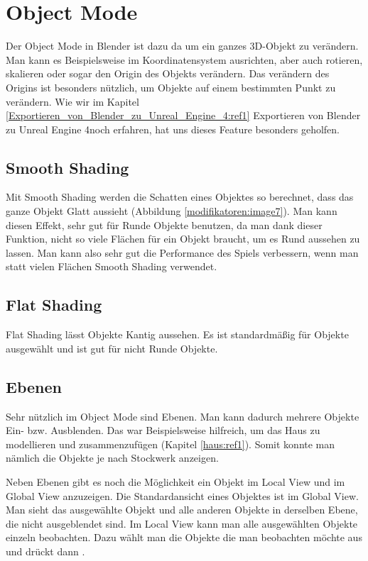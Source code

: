 \section{Object Mode}
Der Object Mode in Blender ist dazu da um ein ganzes 3D-Objekt zu verändern. Man kann es Beispielsweise im Koordinatensystem ausrichten, aber
auch rotieren, skalieren oder sogar den Origin des Objekts verändern. Das verändern des Origins ist besonders nützlich, um Objekte auf
einem bestimmten Punkt zu verändern. Wie wir im Kapitel \ref{Exportieren_von_Blender_zu_Unreal_Engine_4:ref1} \dq Exportieren von Blender zu Unreal Engine 4\dq noch erfahren, hat uns dieses Feature besonders geholfen.

\subsection{Smooth Shading}
\label{objectMode:smoothshading}
Mit Smooth Shading werden die Schatten eines Objektes so berechnet, dass das ganze Objekt Glatt aussieht (Abbildung \ref{modifikatoren:image7}).
Man kann diesen Effekt, sehr gut für Runde Objekte benutzen, da man dank dieser Funktion, nicht so viele Flächen für ein Objekt braucht, um
es Rund aussehen zu lassen. Man kann also sehr gut die Performance des Spiels verbessern, wenn man statt vielen Flächen Smooth Shading verwendet.

\subsection{Flat Shading}
Flat Shading lässt Objekte Kantig aussehen. Es ist standardmäßig für Objekte ausgewählt und ist gut für nicht Runde Objekte.

\subsection{Ebenen}
Sehr nützlich im Object Mode sind Ebenen. Man kann dadurch mehrere Objekte Ein- bzw. Ausblenden.
Das war Beispielsweise hilfreich, um das Haus zu modellieren und zusammenzufügen (Kapitel \ref{haus:ref1}).
Somit konnte man nämlich die Objekte je nach Stockwerk anzeigen.

Neben Ebenen gibt es noch die Möglichkeit ein Objekt im Local View und im Global View anzuzeigen.
Die Standardansicht eines Objektes ist im Global View. Man sieht das ausgewählte Objekt und alle anderen Objekte in derselben Ebene, die nicht ausgeblendet sind.
Im Local View kann man alle ausgewählten Objekte einzeln beobachten. Dazu wählt man die Objekte die man beobachten möchte aus und drückt dann .
